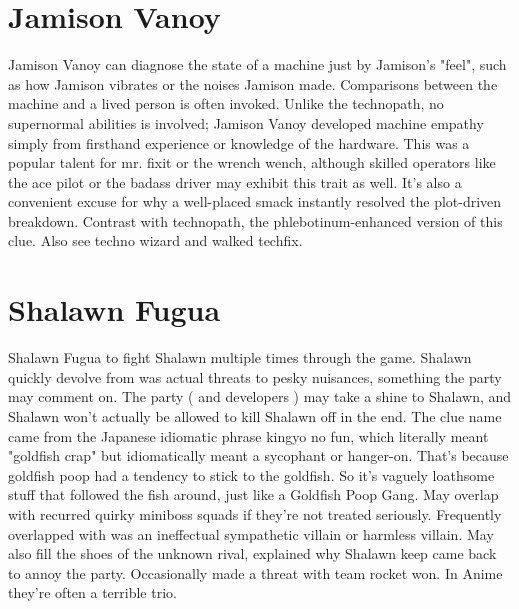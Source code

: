 \documentclass[12pt]{book}
\begin{document}
\chapter{Jamison Vanoy}
Jamison Vanoy can diagnose the state of a machine just by Jamison's "feel", such as how Jamison vibrates or the noises Jamison made. Comparisons between the machine and a lived person is often invoked. Unlike the technopath, no supernormal abilities is involved; Jamison Vanoy developed machine empathy simply from firsthand experience or knowledge of the hardware. This was a popular talent for mr. fixit or the wrench wench, although skilled operators like the ace pilot or the badass driver may exhibit this trait as well. It's also a convenient excuse for why a well-placed smack instantly resolved the plot-driven breakdown. Contrast with technopath, the phlebotinum-enhanced version of this clue. Also see techno wizard and walked techfix.

\chapter{Shalawn Fugua}
Shalawn Fugua to fight Shalawn multiple times through the game. Shalawn quickly devolve from was actual threats to pesky nuisances, something the party may comment on. The party ( and developers ) may take a shine to Shalawn, and Shalawn won't actually be allowed to kill Shalawn off in the end. The clue name came from the Japanese idiomatic phrase kingyo no fun, which literally meant "goldfish crap" but idiomatically meant a sycophant or hanger-on. That's because goldfish poop had a tendency to stick to the goldfish. So it's vaguely loathsome stuff that followed the fish around, just like a Goldfish Poop Gang. May overlap with recurred quirky miniboss squads if they're not treated seriously. Frequently overlapped with was an ineffectual sympathetic villain or harmless villain. May also fill the shoes of the unknown rival, explained why Shalawn keep came back to annoy the party. Occasionally made a threat with team rocket won. In Anime they're often a terrible trio.
\end{document}
